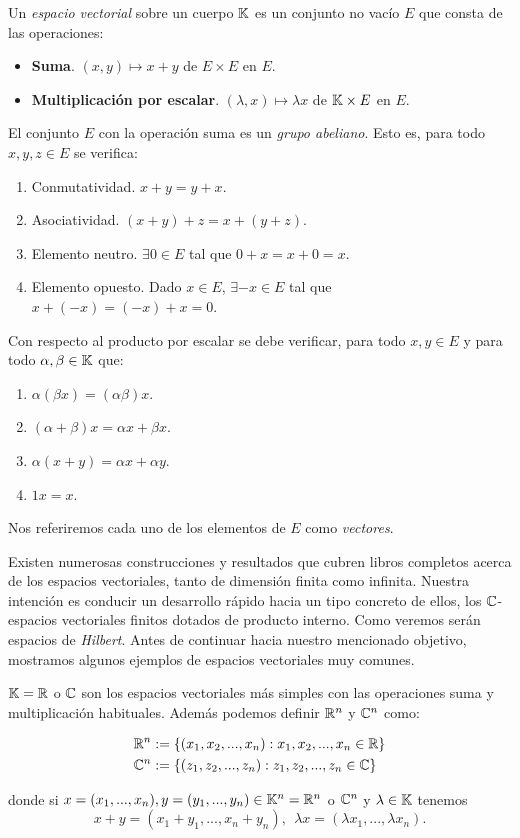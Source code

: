 \begin{definition} Un \textit{espacio vectorial} sobre un cuerpo $\mathbb{K}$ es un conjunto no vacío $E$ que consta de las operaciones:
\begin{itemize}
\item \textbf{Suma}. $(x,y)\mapsto x+y$ de $E\times E$ en $E$.
\item \textbf{Multiplicación por escalar}. $(\lambda,x)\mapsto \lambda x$ de $\mathbb{K}\times E$ en $E$.
\end{itemize}
El conjunto $E$ con la operación suma es un \textit{grupo abeliano}. Esto es, para todo $x,y,z\in E$ se verifica:
\begin{enumerate}[label=\alph*)]
\item Conmutatividad. $x + y = y + x$.
\item Asociatividad. $(x + y) + z = x + (y + z)$.
\item Elemento neutro. $\exists 0\in E$ tal que $0+x=x+0=x$.
\item Elemento opuesto. Dado $x\in E$, $\exists -x\in E$ tal que $x+(-x)=(-x)+x=0$.
\end{enumerate}
Con respecto al producto por escalar se debe verificar, para todo $x,y\in E$ y para todo $\alpha,\beta\in\mathbb{K}$ que:
\begin{enumerate}[label=\alph*)]
\item $\alpha(\beta x)=(\alpha\beta)x$.
\item $(\alpha + \beta)x=\alpha x +\beta x$.
\item $\alpha (x + y) =\alpha x +\alpha y$.
\item $1x = x$.
\end{enumerate}
Nos referiremos cada uno de los elementos de $E$ como \textit{vectores}.
\end{definition}

Existen numerosas construcciones y resultados que cubren libros completos acerca de los espacios vectoriales, tanto de dimensión finita como infinita. Nuestra intención es conducir un desarrollo rápido hacia un tipo concreto de ellos, los $\mathbb{C}$-espacios vectoriales finitos dotados de producto interno. Como veremos serán espacios de \textit{Hilbert}. Antes de continuar hacia nuestro mencionado objetivo, mostramos algunos ejemplos de espacios vectoriales muy comunes.

\begin{example} $\mathbb{K}=\mathbb{R}$ o $\mathbb{C}$ son los espacios vectoriales más simples con las operaciones suma y multiplicación habituales. Además podemos definir $\mathbb{R}^n$ y $\mathbb{C}^n$ como:

\[
\begin{split}
&\mathbb{R}^n:=\{(x_1,x_2,...,x_n): x_1,x_2,...,x_n\in\mathbb{R}\} \\
&\mathbb{C}^n:=\{(z_1,z_2,...,z_n): z_1,z_2,...,z_n\in\mathbb{C}\}
\end{split}
\]%

donde si $x=(x_1,...,x_n),y=(y_1,...,y_n)\in\mathbb{K}^n=\mathbb{R}^n$ o $\mathbb{C}^n$ y $\lambda\in\mathbb{K}$ tenemos
\[x+y=(x_1+y_1,...,x_n+y_n),\ \ \lambda x=(\lambda x_1,...,\lambda x_n).\]
\end{example}

